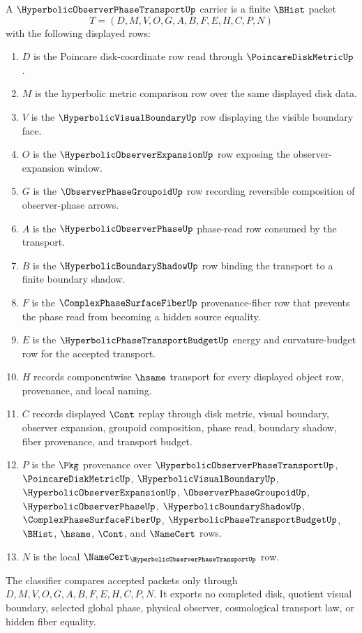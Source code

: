 \begin{definition}
\label{def:hyperbolic-observer-phase-transport-carrier}
A $\HyperbolicObserverPhaseTransportUp$ carrier is a finite $\BHist$ packet
$$
T=(D,M,V,O,G,A,B,F,E,H,C,P,N)
$$
with the following displayed rows:
\begin{enumerate}
\item $D$ is the Poincare disk-coordinate row read through $\PoincareDiskMetricUp$.
\item $M$ is the hyperbolic metric comparison row over the same displayed disk data.
\item $V$ is the $\HyperbolicVisualBoundaryUp$ row displaying the visible boundary face.
\item $O$ is the $\HyperbolicObserverExpansionUp$ row exposing the observer-expansion window.
\item $G$ is the $\ObserverPhaseGroupoidUp$ row recording reversible composition of observer-phase arrows.
\item $A$ is the $\HyperbolicObserverPhaseUp$ phase-read row consumed by the transport.
\item $B$ is the $\HyperbolicBoundaryShadowUp$ row binding the transport to a finite boundary shadow.
\item $F$ is the $\ComplexPhaseSurfaceFiberUp$ provenance-fiber row that prevents the phase read from becoming a hidden source equality.
\item $E$ is the $\HyperbolicPhaseTransportBudgetUp$ energy and curvature-budget row for the accepted transport.
\item $H$ records componentwise $\hsame$ transport for every displayed object row, provenance, and local naming.
\item $C$ records displayed $\Cont$ replay through disk metric, visual boundary, observer expansion, groupoid composition, phase read, boundary shadow, fiber provenance, and transport budget.
\item $P$ is the $\Pkg$ provenance over $\HyperbolicObserverPhaseTransportUp$, $\PoincareDiskMetricUp$, $\HyperbolicVisualBoundaryUp$, $\HyperbolicObserverExpansionUp$, $\ObserverPhaseGroupoidUp$, $\HyperbolicObserverPhaseUp$, $\HyperbolicBoundaryShadowUp$, $\ComplexPhaseSurfaceFiberUp$, $\HyperbolicPhaseTransportBudgetUp$, $\BHist$, $\hsame$, $\Cont$, and $\NameCert$ rows.
\item $N$ is the local $\NameCert_{\HyperbolicObserverPhaseTransportUp}$ row.
\end{enumerate}
The classifier compares accepted packets only through $D,M,V,O,G,A,B,F,E,H,C,P,N$. It exports no completed disk, quotient visual boundary, selected global phase, physical observer, cosmological transport law, or hidden fiber equality.
\end{definition}

